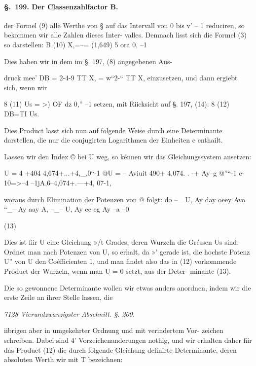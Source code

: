 \documentclass[12pt,a4paper]{article}
\theoremstyle{plain}
\theoremstyle{definition}
\begin{document}
\paragraph{\S.~199. Der Classenzahlfactor B.}


der Formel (9) alle Werthe von § auf das Intervall von 0 bis v' -- 1 reduciren, so bekommen wir alle Zahlen dieses Inter- valles. Demnach lisst sich die Formel (3) so darstellen: B (10) X,=--= (1,649) 5 ora 0, --1

Dies haben wir in dem im §. 197, (8) angegebenen Aus-

druck mee' DB = 2-4-9 TT X, = w``2-`` TT X, einzusetzen, und dann ergiebt sich, wenn wir

8 (11) Us = >) OF dz 0,'' --1 setzen, mit Riicksicht auf §. 197, (14): 8 (12) DB=TI Us.

Dies Product lasst sich nun auf folgende Weise durch eine Determinante darstellen, die nur die conjugirten Logarithmen der Einheiten c enthailt.

Lassen wir den Index © bei U weg, so kénnen wir das Gleichungssystem ansetzen:

U = 4 +404 4,674+...+4,\_,0``-1 @U = -- Aviuit 490+ 4,074. . -+ Ay--g @''``-1 e-10=>--4 --1jA,6--4,074+.---+4, 07-1,

woraus durch Elimination der Potenzen von @ folgt: do --\_ U, Ay day oeey Avo ``\_-- Ay aay A, --\_-- U, Ay ee eg Ay --a --0

(13)

Dies ist fiir U eine Gleichung »/t Grades, deren Wurzeln die Gréssen Us sind. Ordnet man nach Potenzen von U, so erhalt, da »' gerade ist, die hochste Potenz U'' von U den Coéfficienten 1, und man findet also das in (12) vorkommende Product der Wurzeln, wenn man U = 0 setzt, aus der Deter- minante (13).

Die so gewonnene Determinante wollen wir etwas anders anordnen, indem wir die erste Zeile an ihrer Stelle lassen, die

\vspace{0.5\baselineskip}\noindent\textit{7128 Vierundzwanzigster Abschnitt. §. 200.}\par

iibrigen aber in umgekehrter Ordnung und mit verindertem Vor- zeichen schreiben. Dabei sind 4' Vorzeichenanderungen nothig, und wir erhalten daher fiir das Product (12) die durch folgende Gleichung definirte Determinante, deren absoluten Werth wir mit T bezeichnen:
\end{document}
